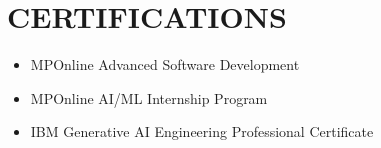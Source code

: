 \documentclass[10pt,a4paper]{article}
\begin{document}

\section*{CERTIFICATIONS}

\begin{itemize}[leftmargin=15pt,itemsep=2pt,topsep=2pt]

\item MPOnline Advanced Software Development
\item MPOnline AI/ML Internship Program
\item IBM Generative AI Engineering Professional Certificate

\end{itemize}
\end{document}
